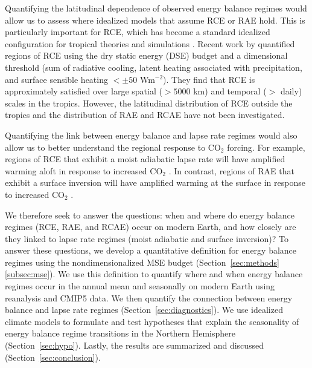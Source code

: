 \documentclass{ametsocV5}
\begin{document}
Quantifying the latitudinal dependence of observed energy balance regimes would allow us to assess where idealized models that assume RCE or RAE hold. This is particularly important for RCE, which has become a standard idealized configuration for tropical theories \citep[e.g.,][]{emanuel1996,nilsson1999,romps2014,singh2015} and simulations \citep[][and the references therein]{wing2018}. Recent work by \cite{jakob2019} quantified regions of RCE using the dry static energy (DSE) budget and a dimensional threshold (sum of radiative cooling, latent heating associated with precipitation, and surface sensible heating $< \pm 50$ Wm$^{-2}$). They find that RCE is approximately satisfied over large spatial ($>5000$ km) and temporal ($>$ daily) scales in the tropics. However, the latitudinal distribution of RCE outside the tropics and the distribution of RAE and RCAE have not been investigated.
  
Quantifying the link between energy balance and lapse rate regimes would also allow us to better understand the regional response to CO$_2$ forcing. For example, regions of RCE that exhibit a moist adiabatic lapse rate will have amplified warming aloft in response to increased CO$_2$ \citep{held1993, romps2011, payne2015}. In contrast, regions of RAE that exhibit a surface inversion will have amplified warming at the surface in response to increased CO$_2$ \citep{held1993, payne2015, cronin2016}.

We therefore seek to answer the questions: when and where do energy balance regimes (RCE, RAE, and RCAE) occur on modern Earth, and how closely are they linked to lapse rate regimes (moist adiabatic and surface inversion)? To answer these questions, we develop a quantitative definition for energy balance regimes using the nondimensionalized MSE budget (Section~\ref{sec:methods}\ref{subsec:mse}). We use this definition to quantify where and when energy balance regimes occur in the annual mean and seasonally on modern Earth using reanalysis and CMIP5 data. We then quantify the connection between energy balance and lapse rate regimes (Section~\ref{sec:diagnostics}). We use idealized climate models to formulate and test hypotheses that explain the seasonality of energy balance regime transitions in the Northern Hemisphere (Section~\ref{sec:hypo}). Lastly, the results are summarized and discussed (Section~\ref{sec:conclusion}).
\end{document}
